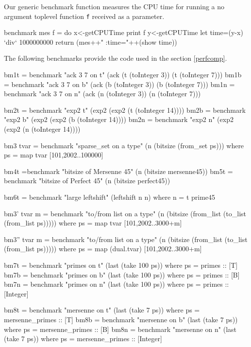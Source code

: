 \documentclass{TOOLS/llncs}
\begin{document}
Our generic benchmark function measures the CPU time
for running a no argument toplevel function {\tt f} received
as a parameter.
\begin{code}
benchmark mes f = do
  x<-getCPUTime
  print f
  y<-getCPUTime
  let time=(y-x) `div` 1000000000
  return (mes++" :time="++(show time))
\end{code}
The following benchmarks provide the code used
in the section \ref{perfcomp}.
\begin{code}
bm1t = benchmark "ack 3 7 on t" (ack (t (toInteger 3)) (t (toInteger 7)))
bm1b = benchmark "ack 3 7 on b" (ack (b (toInteger 3)) (b (toInteger 7)))
bm1n = benchmark "ack 3 7 on n" (ack (n (toInteger 3)) (n (toInteger 7)))

bm2t = benchmark "exp2 t" (exp2 (exp2 (t (toInteger 14))))
bm2b = benchmark "exp2 b" (exp2 (exp2 (b (toInteger 14))))
bm2n = benchmark "exp2 n" (exp2 (exp2 (n (toInteger 14))))

bm3 tvar = benchmark "sparse_set on a type" (n (bitsize (from_set ps)))
  where ps = map tvar [101,2002..100000]

bm4t =benchmark "bitsize of Mersenne 45"  (n (bitsize mersenne45))
bm5t = benchmark "bitsize of Perfect 45" (n (bitsize perfect45))

bm6t = benchmark "large leftshift" (leftshift n n) where
  n = t prime45

bm3' tvar m = benchmark "to/from list on a type" 
              (n (bitsize (from_list (to_list (from_list ps)))))
  where ps = map tvar [101,2002..3000+m]

bm3'' tvar m = benchmark "to/from list on a type" 
              (n (bitsize (from_list (to_list (from_list ps)))))
  where ps = map (dual.tvar) [101,2002..3000+m]

bm7t = benchmark "primes on t" 
  (last (take 100 ps)) where ps = primes :: [T]
bm7b = benchmark "primes on b" 
  (last (take 100 ps)) where ps = primes :: [B]
bm7n = benchmark "primes on n" 
  (last (take 100 ps)) where ps = primes :: [Integer]

bm8t = benchmark "mersenne on t" 
  (last (take 7 ps)) where ps = mersenne_primes :: [T]
bm8b = benchmark "mersenne on b" 
  (last (take 7 ps)) where ps = mersenne_primes :: [B]
bm8n = benchmark "mersenne on n" 
  (last (take 7 ps)) where ps = mersenne_primes :: [Integer]
\end{code}
\end{document}
